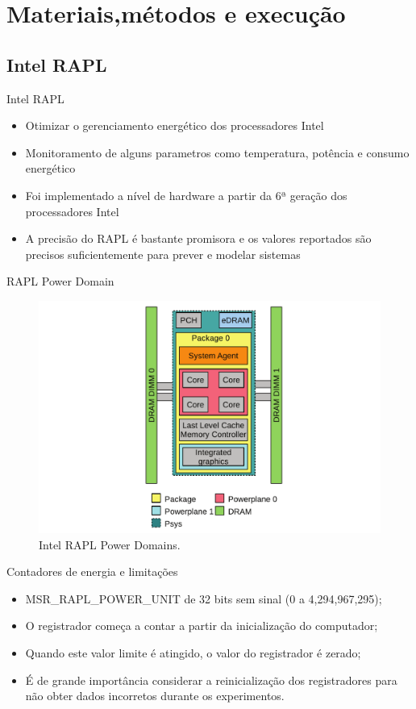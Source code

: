 \section{Materiais,métodos e execução}

\subsection{Intel RAPL}
\begin{frame}{Intel RAPL}
    \begin{itemize}
        \item Otimizar o gerenciamento energético dos processadores Intel
        \item Monitoramento de alguns parametros como temperatura, potência e consumo energético
        \item Foi implementado a nível de hardware a partir da 6ª geração dos processadores Intel
        \item A precisão do RAPL é bastante promisora e os valores reportados são precisos suficientemente para prever e modelar sistemas \cite{khan2018IntelRapl}
    \end{itemize}
\end{frame}

\begin{frame}{RAPL Power Domain}
    \begin{figure}
        \centering
        \includegraphics[width=0.61\linewidth]{images/powerDomainsRAPL.png}
        \caption{Intel RAPL Power Domains. \cite{khan2018IntelRapl}}
        \label{fig:powerDomains}
    \end{figure}
\end{frame}

\begin{frame}{Contadores de energia e limitações}
    \begin{itemize}
        \item MSR\_RAPL\_POWER\_UNIT de 32 bits sem sinal (0 a 4,294,967,295);
        \item O registrador começa a contar a partir da inicialização do computador;
        \item Quando este valor limite é atingido, o valor do registrador é zerado;
        \item É de grande importância considerar a reinicialização
        dos registradores para não obter dados incorretos durante os experimentos.
    \end{itemize}
\end{frame}

